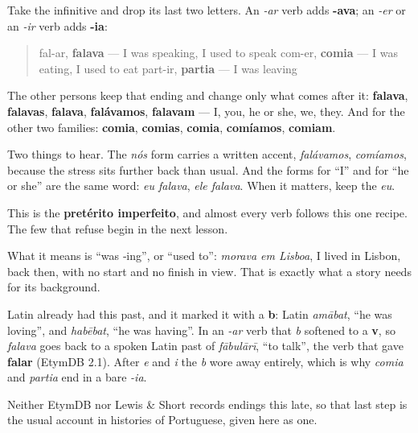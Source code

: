 \begin{grammarlens}[title={Grammar Lens: two endings, three families}]
Take the infinitive and drop its last two letters. An \emph{-ar} verb adds \textbf{-ava}; an \emph{-er} or an \emph{-ir} verb adds \textbf{-ia}:

\begin{quote}
fal-ar, \textbf{falava} — I was speaking, I used to speak com-er, \textbf{comia} — I was eating, I used to eat part-ir, \textbf{partia} — I was leaving
\end{quote}

The other persons keep that ending and change only what comes after it: \textbf{falava}, \textbf{falavas}, \textbf{falava}, \textbf{falávamos}, \textbf{falavam} — I, you, he or she, we, they. And for the other two families: \textbf{comia}, \textbf{comias}, \textbf{comia}, \textbf{comíamos}, \textbf{comiam}.

Two things to hear. The \emph{nós} form carries a written accent, \emph{falávamos}, \emph{comíamos}, because the stress sits further back than usual. And the forms for \textquotedblleft{}I\textquotedblright{} and for \textquotedblleft{}he or she\textquotedblright{} are the same word: \emph{eu falava}, \emph{ele falava}. When it matters, keep the \emph{eu}.

This is the \textbf{pretérito imperfeito}, and almost every verb follows this one recipe. The few that refuse begin in the next lesson.

What it means is \textquotedblleft{}was ‑ing\textquotedblright{}, or \textquotedblleft{}used to\textquotedblright{}: \emph{morava em Lisboa}, I lived in Lisbon, back then, with no start and no finish in view. That is exactly what a story needs for its background.
\end{grammarlens}

\begin{cousinweb}
Latin already had this past, and it marked it with a \textbf{b}: Latin \emph{amābat}, \textquotedblleft{}he was loving\textquotedblright{}, and \emph{habēbat}, \textquotedblleft{}he was having\textquotedblright{}. In an \emph{-ar} verb that \emph{b} softened to a \textbf{v}, so \emph{falava} goes back to a spoken Latin past of \emph{fābulārī}, \textquotedblleft{}to talk\textquotedblright{}, the verb that gave \textbf{falar} (EtymDB 2.1). After \emph{e} and \emph{i} the \emph{b} wore away entirely, which is why \emph{comia} and \emph{partia} end in a bare \emph{-ia}.

Neither EtymDB nor Lewis \& Short records endings this late, so that last step is the usual account in histories of Portuguese, given here as one.
\end{cousinweb}

